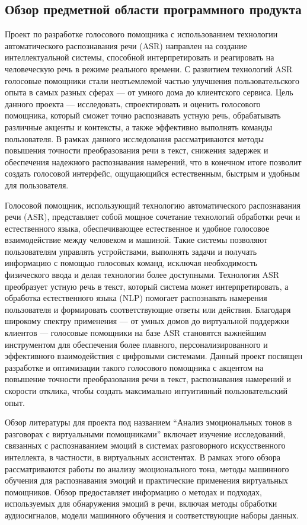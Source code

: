 \subsection{Обзор предметной области программного продукта}

Проект по разработке голосового помощника с использованием технологии автоматического распознавания речи (ASR) направлен на создание интеллектуальной системы, способной интерпретировать и реагировать на человеческую речь в режиме реального времени. С развитием технологий ASR голосовые помощники стали неотъемлемой частью улучшения пользовательского опыта в самых разных сферах — от умного дома до клиентского сервиса. Цель данного проекта — исследовать, спроектировать и оценить голосового помощника, который сможет точно распознавать устную речь, обрабатывать различные акценты и контексты, а также эффективно выполнять команды пользователя. В рамках данного исследования рассматриваются методы повышения точности преобразования речи в текст, снижения задержек и обеспечения надежного распознавания намерений, что в конечном итоге позволит создать голосовой интерфейс, ощущающийся естественным, быстрым и удобным для пользователя.

Голосовой помощник, использующий технологию автоматического распознавания речи (ASR), представляет собой мощное сочетание технологий обработки речи и естественного языка, обеспечивающее естественное и удобное голосовое взаимодействие между человеком и машиной. Такие системы позволяют пользователям управлять устройствами, выполнять задачи и получать информацию с помощью голосовых команд, исключая необходимость физического ввода и делая технологии более доступными. Технология ASR преобразует устную речь в текст, который система может интерпретировать, а обработка естественного языка (NLP) помогает распознавать намерения пользователя и формировать соответствующие ответы или действия. Благодаря широкому спектру применения — от умных домов до виртуальной поддержки клиентов — голосовые помощники на базе ASR становятся важнейшим инструментом для обеспечения более плавного, персонализированного и эффективного взаимодействия с цифровыми системами. Данный проект посвящен разработке и оптимизации такого голосового помощника с акцентом на повышение точности преобразования речи в текст, распознавания намерений и скорости отклика, чтобы создать максимально интуитивный пользовательский опыт.


Обзор литературы для проекта под названием ``Анализ эмоциональных тонов в разговорах с виртуальными помощниками'' включает изучение исследований, связанных с распознаванием эмоций в системах разговорного искусственного интеллекта, в частности, в виртуальных ассистентах. В рамках этого обзора рассматриваются работы по анализу эмоционального тона, методы машинного обучения для распознавания эмоций и практические применения виртуальных помощников. Обзор предоставляет информацию о методах и подходах, используемых для обнаружения эмоций в речи, включая методы обработки аудиосигналов, модели машинного обучения и соответствующие наборы данных.


